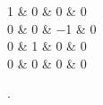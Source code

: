 \begin{texcode}[gobble=4, emph={[2]pmatrix}]
        \begin{pmatrix}
            1 & 0 & 0  & 0 \\
            0 & 0 & −1 & 0 \\
            0 & 1 & 0  & 0 \\
            0 & 0 & 0  & 0 \\
        \end{pmatrix}.
\end{texcode}